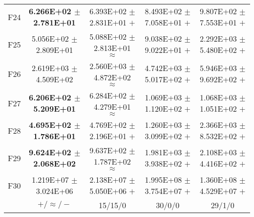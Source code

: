 \documentclass[paper]{ieice}
\begin{document}
\begin{table*}[htbp]
\begin{tabular}{c|c|c|c|c}
		F24	&	\textbf{6.266E+02	$\pm$	2.781E+01}		&	6.393E+02	$\pm$	2.831E+01	$+$	&	8.493E+02	$\pm$	7.058E+01	$+$	&	9.807E+02	$\pm$	7.553E+01	$+$	\\
		F25	&	5.056E+02	$\pm$	2.809E+01		&	5.088E+02	$\pm$	2.813E+01	$\approx$	&	9.038E+02	$\pm$	9.022E+01	$+$	&	2.292E+03	$\pm$	5.480E+02	$+$	\\
		F26	&	2.619E+03	$\pm$	4.509E+02		&	2.560E+03	$\pm$	4.872E+02	$\approx$	&	4.742E+03	$\pm$	5.017E+02	$+$	&	5.946E+03	$\pm$	9.692E+02	$+$	\\
		F27	&	\textbf{6.206E+02	$\pm$	5.209E+01}		&	6.284E+02	$\pm$	4.279E+01	$\approx$	&	1.069E+03	$\pm$	1.120E+02	$+$	&	1.068E+03	$\pm$	1.051E+02	$+$	\\
		F28	&	\textbf{4.695E+02	$\pm$	1.786E+01}		&	4.769E+02	$\pm$	2.196E+01	$+$	&	1.260E+03	$\pm$	3.099E+02	$+$	&	2.366E+03	$\pm$	8.532E+02	$+$	\\
		F29	&	\textbf{9.624E+02	$\pm$	2.068E+02}		&	9.637E+02	$\pm$	1.787E+02	$\approx$	&	1.981E+03	$\pm$	3.938E+02	$+$	&	2.108E+03	$\pm$	4.416E+02	$+$	\\
		F30	&	1.219E+07	$\pm$	3.024E+06		&	2.138E+07	$\pm$	5.050E+06	$+$	&	1.995E+08	$\pm$	3.754E+07	$+$	&	1.360E+08	$\pm$	4.529E+07	$+$	\\ \hline
		
		&	$+/\approx/-$				&	15/15/0				&	30/0/0				&	29/1/0				\\ \hline
		

\end{tabular}
\end{table*}
\end{document}
